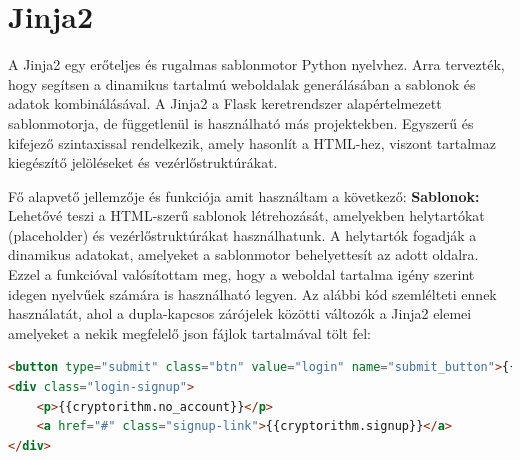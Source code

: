 \section {Jinja2}
\label{sec:jinja2}
A Jinja2 egy erőteljes és rugalmas sablonmotor Python nyelvhez. Arra tervezték, hogy segítsen a dinamikus tartalmú weboldalak generálásában a sablonok és adatok kombinálásával. A Jinja2 a Flask keretrendszer alapértelmezett sablonmotorja, de függetlenül is használható más projektekben. Egyszerű és kifejező szintaxissal rendelkezik, amely hasonlít a HTML-hez, viszont tartalmaz kiegészítő jelöléseket és vezérlőstruktúrákat.

Fő alapvető jellemzője és funkciója amit használtam a következő:
 	 \textbf{Sablonok:}
Lehetővé teszi a HTML-szerű sablonok létrehozását, amelyekben helytartókat (placeholder) és vezérlőstruktúrákat használhatunk. A helytartók fogadják a dinamikus adatokat, amelyeket a sablonmotor behelyettesít az adott oldalra. Ezzel a funkcióval valósítottam meg, hogy a weboldal tartalma igény szerint idegen nyelvűek számára is használható legyen.
Az alábbi kód szemlélteti ennek használatát, ahol a dupla-kapcsos zárójelek közötti változók a Jinja2 elemei amelyeket a nekik megfelelő json fájlok tartalmával tölt fel:
\begin{lstlisting}[caption={Jinja2 sablon kódrészlet}, captionpos=b,  language = HTML]
<button type="submit" class="btn" value="login" name="submit_button">{{cryptorithm.login}}</button>
<div class="login-signup">
	<p>{{cryptorithm.no_account}}</p>
	<a href="#" class="signup-link">{{cryptorithm.signup}}</a>
</div>
\end{lstlisting}
